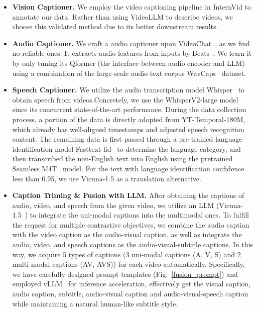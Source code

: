\begin{itemize}[leftmargin=*]
    \item[$\bullet$] \textbf{Vision Captioner.} We employ the video captioning pipeline in InternVid to annotate our data. Rather than using VideoLLM \citep{li2023videochat,videochatgpt} to describe videos, we choose this validated method due to its better downstream results. 
    \item[$\bullet$] \textbf{Audio Captioner.} We craft a audio captioner upon VideoChat~\citep{li2023videochat}, as we find no reliable ones. It extracts audio features from inputs by Beats~\citep{beats}. We learn it by only tuning its Qformer (the interface between audio encoder and LLM) using a combination of the large-scale audio-text corpus WavCaps~\citep{mei2023wavcaps} dataset.
    \item[$\bullet$] \textbf{Speech Captioner.} We utilize the audio transcription model Whisper~\citep{whisper} to obtain speech from videos.Concretely, we use the WhisperV2-large model since its concurrent state-of-the-art performance. During the data collection process, a portion of the data is directly adopted from YT-Temporal-180M, which already has well-aligned timestamps and adjusted speech recognition content. The remaining data is first passed through a pre-trained language identification model Fasttext-lid~\citep{joulin2016bag} to determine the language category, and then transcribed the non-English text into English using the pretrained Seamless M4T~\citep{communication2023seamlessm4t} model. For the text with language identification confidence less than 0.95, we use Vicuna-1.5 as a translation alternative.
    \item[$\bullet$] \textbf{Caption Triming \& Fusion with LLM.} After obtaining the captions of audio, video, and speech from the given video, we utilize an LLM (Vicuna-1.5~\citep{vicuna}) to integrate the uni-modal captions into the multimodal ones. To fulfill the request for multiple contrastive objectives, we combine the audio caption with the video caption as the audio-visual caption, as well as integrate the audio, video, and speech captions as the audio-visual-subtitle captions. In this way, we acquire 5 types of captions (3 uni-modal captions (A, V, S) and 2 multi-modal captions (AV, AVS)) for each video automatically. Specifically, we have carefully designed prompt templates (Fig.~\ref{fusion_prompt}) and employed vLLM~\citep{kwon2023efficient} for inference acceleration, effectively get the visual caption, audio caption, subtitle, audio-visual caption and audio-visual-speech caption while maintaining a natural human-like subtitle style.
\end{itemize}

